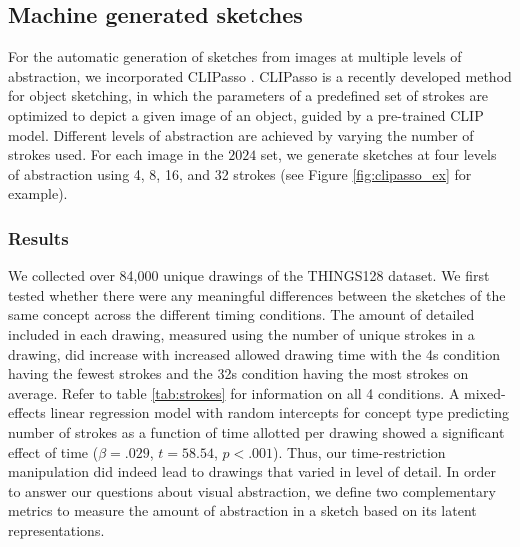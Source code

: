 \documentclass[10pt,letterpaper]{article}
\begin{document}
\subsection{Machine generated sketches}
For the automatic generation of sketches from images at multiple levels of abstraction, we incorporated CLIPasso \cite{vinker2022clipasso}.
CLIPasso is a recently developed method for object sketching, in which the parameters of a predefined set of strokes are optimized to depict a given image of an object, guided by a pre-trained CLIP \cite{radford2021learning} model.
Different levels of abstraction are achieved by varying the number of strokes used. 
For each image in the $2024$ set, we generate sketches at four levels of abstraction using 4, 8, 16, and 32 strokes (see Figure \ref{fig:clipasso_ex} for example).



\subsubsection{Results}
We collected over 84,000 unique drawings of the THINGS128 dataset. We first tested whether there were any meaningful differences between the sketches of the same concept across the different timing conditions.
The amount of detailed included in each drawing, measured using the number of unique strokes in a drawing, did increase with increased allowed drawing time with the 4s condition having the fewest strokes and the 32s condition having the most strokes on average. Refer to table \ref{tab:strokes} for information on all 4 conditions.
A mixed-effects linear regression model with random intercepts for concept type predicting number of strokes as a function of time allotted per drawing showed a significant effect of time ($\beta=.029$, $t=58.54$, $p<.001$). Thus, our time-restriction manipulation did indeed lead to drawings that varied in level of detail. In order to answer our questions about visual abstraction, we define two complementary metrics to measure the amount of abstraction in a sketch based on its latent representations. 
\end{document}
